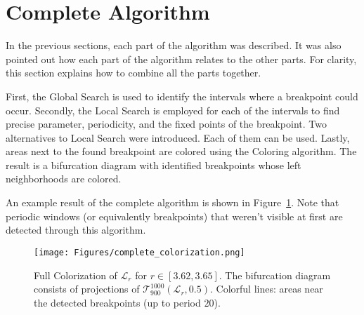 \section{Complete Algorithm}
In the previous sections, each part of the algorithm was described.
It was also pointed out how each part of the algorithm relates to the other parts.
For clarity, this section explains how to combine all the parts together.
\par
First, the Global Search is used to identify the intervals where a breakpoint could occur.
Secondly, the Local Search is employed for each of the intervals to find precise parameter, periodicity, and the fixed points of the breakpoint.
Two alternatives to Local Search were introduced.
Each of them can be used.
Lastly, areas next to the found breakpoint are colored using the Coloring algorithm.
The result is a bifurcation diagram with identified breakpoints whose left neighborhoods are colored.
\par
An example result of the complete algorithm is shown in Figure~\ref{fig:complete_colorization}.
Note that periodic windows (or equivalently breakpoints) that weren't visible at first are detected through this algorithm.

\begin{figure}[!h]
    \centering
    \texttt{[image: Figures/complete\_colorization.png]}
    \caption{
        Full Colorization of $\mathcal{L}_{r}$ for $r \in [ 3.62, 3.65 ]$.
        The bifurcation diagram consists of projections of $\mathcal{T}_{900}^{1000}(\mathcal{L}_{r}, 0.5)$.
        Colorful lines: areas near the detected breakpoints (up to period $20$).
    }
    \label{fig:complete_colorization}
\end{figure}

\endinput